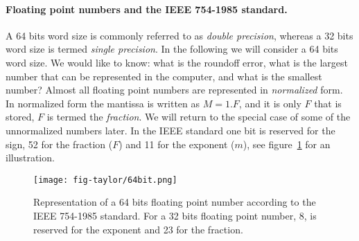\documentclass[graybox,sectrefs,envcountresetchap,open=right,final]{svmonodo}
\begin{document}
\paragraph{Floating point numbers and the IEEE 754-1985 standard.}
A 64 bits word size is commonly referred to as \emph{double precision}, whereas a 32 bits word size is termed \emph{single precision}. In the following we will consider a 64 bits word size. We would like to know: what is the roundoff error, what is the largest number that can be represented in the computer, and what is the smallest number? Almost all floating point numbers are represented in \emph{normalized} form. In normalized form the mantissa is written as $M=1.F$, and it is only $F$ that is stored,   $F$ is termed the \emph{fraction}. We will return to the special case of some of the unnormalized numbers later. In the IEEE standard one bit is reserved for the sign, 52 for the fraction ($F$) and 11 for the exponent ($m$), see figure~\ref{fig:taylor:64bit} for an illustration.

\begin{figure}[!ht]  %
  \centerline{\texttt{[image: fig-taylor/64bit.png]}}
  \caption{
  Representation of a 64 bits floating point number according to the IEEE 754-1985 standard. For a 32 bits floating point number, 8, is reserved for the exponent and 23 for the fraction. \label{fig:taylor:64bit}
  }
\end{figure}
\end{document}
